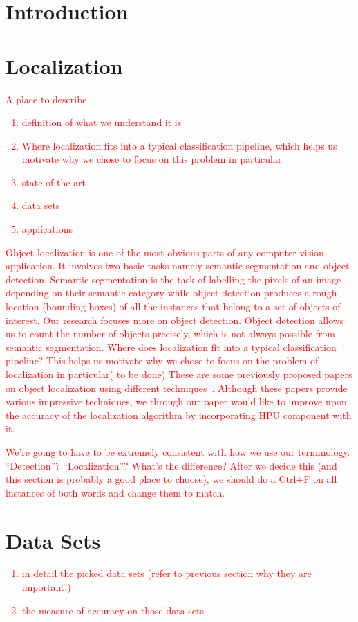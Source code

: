 \documentclass[10pt,twocolumn,letterpaper]{article}
\newcommand{\preliminary}[1]{\textcolor{red}{#1}}
\newcommand{\todo}{\colorbox{yellow}{\fbox{\LARGE{TODO}}}}
\begin{document}
\section{Introduction}

\section{Localization}
\preliminary{
A place to describe
\begin{enumerate}
\item definition of what we understand it is
\item Where localization fits into a typical classification pipeline, which helps us motivate why we chose to focus on this problem in particular
\item state of the art
\item data sets
\item applications
\end{enumerate}
}

\preliminary {
Object localization is one of the most obvious parts of any computer vision application. It involves two basic tasks namely semantic segmentation and object detection. Semantic segmentation is the task of labelling the pixels of an image depending on their semantic category while object detection produces a rough location (bounding boxes) of all the instances that belong to a set of objects of interest. Our research focuses more on object detection. Object detection allows us to count the number of objects precisely, which is not always possible from semantic segmentation.
Where does localization fit into a typical classification pipeline? This helps us motivate why we chose to focus on the problem of localization in particular( to be done)
These are some previously proposed papers on object localization using different techniques~\cite{localization01,localization02}. Although these papers provide various impressive techniques, we through our paper would like to improve upon the accuracy of the localization algorithm by incorporating HPU component with it.
}

\preliminary{
\todo We're going to have to be extremely consistent with how we use our terminology. ``Detection''? ``Localization''? What's the difference? After we decide this (and this section is probably a good place to choose), we should do a Ctrl+F on all instances of both words and change them to match.
}


\section{Data Sets}
\preliminary{
\begin{enumerate}
\item in detail the picked data sets (refer to previous section why they are important.)
\item the measure of accuracy on those data sets
\end{enumerate}
}
\end{document}
